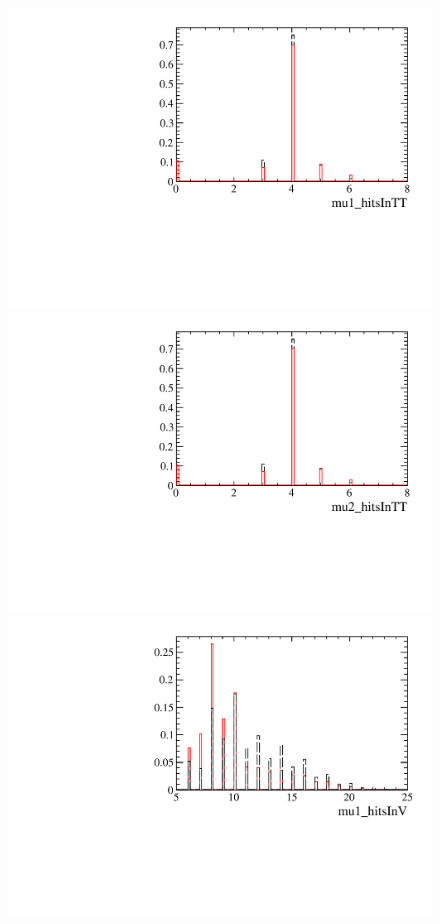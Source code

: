 \begin{figure} [htb!]
\begin{center}
\includegraphics[scale=0.20]{figs/mu1_hitsInTTPARTIAL2pipi.pdf}
\includegraphics[scale=0.20]{figs/mu2_hitsInTTPARTIAL2pipi.pdf}
\includegraphics[scale=0.20]{figs/mu1_hitsInVPARTIAL2pipi.pdf}

\end{center}
\end{figure}
